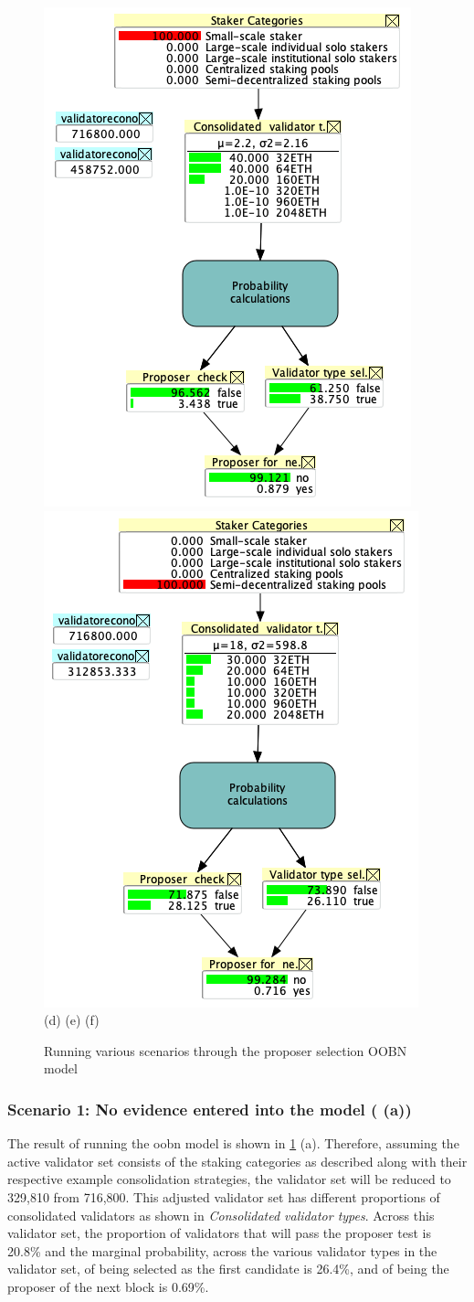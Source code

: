 \documentclass[submission,copyright,creativecommons]{eptcs}
\begin{document}
\begin{figure}[htbp]
\begin{center}
\includegraphics[width=0.3\linewidth]{images/proposer-bn-run-small}
\includegraphics[width=0.3\linewidth]{images/proposer-bn-run-semidecentralised} \\
\hspace{20pt}(d) \hspace{110pt} (e) \hspace{110pt} (f) \\
\caption{Running various scenarios through the proposer selection OOBN model}
\label{fig:runoobn}
\end{center}
\end{figure}

\subsubsection*{Scenario 1: No evidence entered into the model ( (a))}
The result of running the \gls{oobn} model is shown in \cref{fig:runoobn} (a). Therefore, assuming the active validator set consists of the staking categories as described along with their respective example consolidation strategies, the validator set will be reduced to 329,810 from 716,800. This adjusted validator set has different proportions of consolidated validators as shown in  \textit{Consolidated validator types}. Across this validator set, the proportion of validators that will pass the proposer test is 20.8\% and the marginal probability, across the various validator types in the validator set, of being selected as the first candidate is 26.4\%, and of being the proposer of the next block is 0.69\%.
\end{document}
